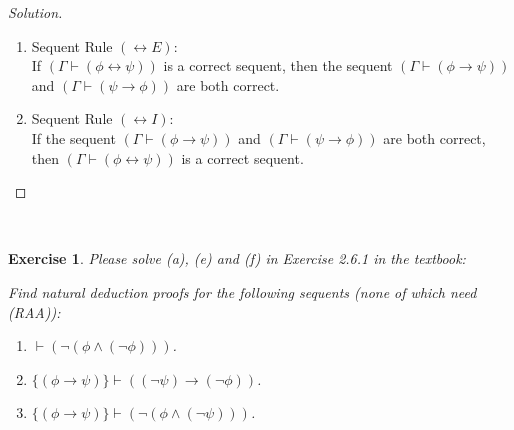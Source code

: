 \documentclass[12pt,a4paper]{article}
\theoremstyle{plain}
\newtheorem{exercise}{Exercise}
\begin{document}
\begin{proof}[Solution]\
    \begin{enumerate}
        \item[a.] Sequent Rule $(\leftrightarrow E)$:\\
        If $(\Gamma \vdash (\phi \leftrightarrow \psi))$ is a correct sequent, then the sequent $(\Gamma \vdash (\phi \to \psi))$ and $(\Gamma \vdash (\psi \to \phi))$ are both correct.
        
        \item[b.] Sequent Rule $(\leftrightarrow I)$:\\
        If the sequent $(\Gamma \vdash (\phi \to \psi))$ and $(\Gamma \vdash (\psi \to \phi))$ are both correct, then $(\Gamma \vdash (\phi \leftrightarrow \psi))$ is a correct sequent.
    \end{enumerate}

\end{proof}

\ \\
\begin{exercise}
Please solve (a), (e) and (f) in Exercise 2.6.1 in the textbook:

Find natural deduction proofs for the following sequents (none of which need (RAA)):
%
\begin{enumerate}

\item[(a)] $\vdash ( \neg ( \phi \wedge ( \neg \phi ) ) )$.

\item[(e)] $\{ ( \phi \rightarrow \psi ) \} \vdash ( ( \neg \psi ) \rightarrow ( \neg \phi ) )$.

\item[(f)] $\{ ( \phi \rightarrow \psi ) \} \vdash ( \neg ( \phi \wedge ( \neg \psi ) ) )$.

\end{enumerate}
\end{exercise}
\end{document}
